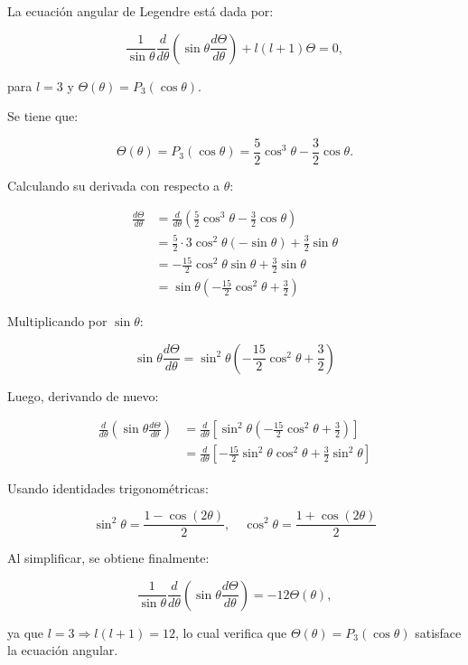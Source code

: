 \documentclass[12pt]{article}
\begin{document}
La ecuación angular de Legendre está dada por:

\[
\frac{1}{\sin\theta} \frac{d}{d\theta} \left( \sin\theta \frac{d\Theta}{d\theta} \right) + l(l+1)\Theta = 0,
\]

para \( l = 3 \) y \( \Theta(\theta) = P_3(\cos\theta) \).

Se tiene que:

\[
\Theta(\theta) = P_3(\cos\theta) = \frac{5}{2} \cos^3\theta - \frac{3}{2} \cos\theta.
\]

Calculando su derivada con respecto a \( \theta \):

\begin{align*}
\frac{d\Theta}{d\theta} &= \frac{d}{d\theta} \left( \frac{5}{2} \cos^3\theta - \frac{3}{2} \cos\theta \right) \\
&= \frac{5}{2} \cdot 3 \cos^2\theta (-\sin\theta) + \frac{3}{2} \sin\theta \\
&= -\frac{15}{2} \cos^2\theta \sin\theta + \frac{3}{2} \sin\theta \\
&= \sin\theta \left( -\frac{15}{2} \cos^2\theta + \frac{3}{2} \right)
\end{align*}

Multiplicando por \( \sin\theta \):

\[
\sin\theta \frac{d\Theta}{d\theta} = \sin^2\theta \left( -\frac{15}{2} \cos^2\theta + \frac{3}{2} \right)
\]

Luego, derivando de nuevo:

\begin{align*}
\frac{d}{d\theta} \left( \sin\theta \frac{d\Theta}{d\theta} \right) &= \frac{d}{d\theta} \left[ \sin^2\theta \left( -\frac{15}{2} \cos^2\theta + \frac{3}{2} \right) \right] \\
&= \frac{d}{d\theta} \left[ -\frac{15}{2} \sin^2\theta \cos^2\theta + \frac{3}{2} \sin^2\theta \right]
\end{align*}

Usando identidades trigonométricas:

\[
\sin^2\theta = \frac{1 - \cos(2\theta)}{2}, \quad \cos^2\theta = \frac{1 + \cos(2\theta)}{2}
\]

Al simplificar, se obtiene finalmente:

\[
\frac{1}{\sin\theta} \frac{d}{d\theta} \left( \sin\theta \frac{d\Theta}{d\theta} \right) = -12 \Theta(\theta),
\]

ya que \( l = 3 \Rightarrow l(l+1) = 12 \), lo cual verifica que \( \Theta(\theta) = P_3(\cos\theta) \) satisface la ecuación angular.
\end{document}
